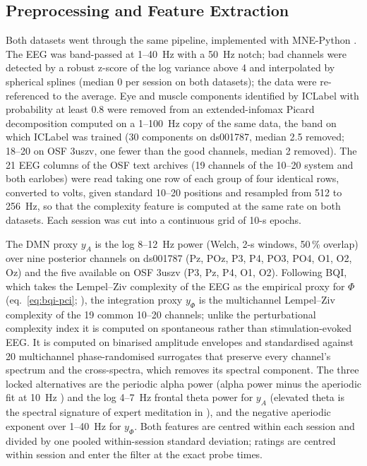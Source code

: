 \subsection{Preprocessing and Feature Extraction}
\label{sec:prep}
Both datasets went through the same pipeline, implemented with MNE-Python \cite{Gramfort2013}. The EEG was band-passed at 1--40~Hz with a 50~Hz notch; bad channels were detected by a robust z-score of the log variance above 4 and interpolated by spherical splines (median 0 per session on both datasets); the data were re-referenced to the average. Eye and muscle components identified by ICLabel \cite{PionTonachini2019} with probability at least 0.8 were removed from an extended-infomax Picard decomposition \cite{Ablin2018} computed on a 1--100~Hz copy of the same data, the band on which ICLabel was trained (30 components on ds001787, median 2.5 removed; 18--20 on OSF 3uszv, one fewer than the good channels, median 2 removed). The 21 EEG columns of the OSF text archives (19 channels of the 10--20 system and both earlobes) were read taking one row of each group of four identical rows, converted to volts, given standard 10--20 positions and resampled from 512 to 256~Hz, so that the complexity feature is computed at the same rate on both datasets. Each session was cut into a continuous grid of 10-s epochs.

The DMN proxy $y_A$ is the log 8--12~Hz power (Welch, 2-s windows, 50\,\% overlap) over nine posterior channels on ds001787 (Pz, POz, P3, P4, PO3, PO4, O1, O2, Oz) and the five available on OSF 3uszv (P3, Pz, P4, O1, O2). Following BQI, which takes the Lempel--Ziv complexity of the EEG as the empirical proxy for $\Phi$ (eq.~\eqref{eq:bqi-pci}; \cite[Sec.~6.3, eq.~(49)]{BQI}), the integration proxy $y_\Phi$ is the multichannel Lempel--Ziv complexity \cite{Schartner2015} of the 19 common 10--20 channels; unlike the perturbational complexity index it is computed on spontaneous rather than stimulation-evoked EEG. It is computed on binarised amplitude envelopes and standardised against 20 multichannel phase-randomised surrogates that preserve every channel's spectrum and the cross-spectra, which removes its spectral component. The three locked alternatives are the periodic alpha power (alpha power minus the aperiodic fit at 10~Hz \cite{Donoghue2020}) and the log 4--7~Hz frontal theta power for $y_A$ (elevated theta is the spectral signature of expert meditation in \cite[App.~B.2]{BQI}), and the negative aperiodic exponent over 1--40~Hz for $y_\Phi$. Both features are centred within each session and divided by one pooled within-session standard deviation; ratings are centred within session and enter the filter at the exact probe times.

